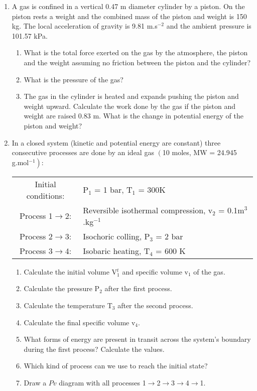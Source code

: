 \documentclass[12pts,a4paper,amsmath,amssymb,floatfix]{article}%
\begin{document}
\begin{enumerate}[label=\bfseries Problem \arabic*:]

\item\label{Tut02:CylinderPiston1}A gas is confined in a vertical 0.47 m diameter cylinder by a piston. On the piston rests a weight and the combined mass of the piston and weight is 150 kg. The local acceleration of gravity is 9.81 m.s$^{-2}$ and the ambient pressure is 101.57 kPa.
\begin{enumerate}
\item What is the total force exerted on the gas by the atmosphere, the piston and the weight assuming no friction between the piston and the cylinder?
\item What is the pressure of the gas? 
\item The gas in the cylinder is heated and expands pushing the piston and weight upward. Calculate the work done by the gas if the piston and weight are raised 0.83 m. What is the change in potential energy of the piston and weight?
\end{enumerate}

\item\label{Tut02:IdealGas1}In a closed system (kinetic and potential energy are constant) three consecutive processes are done by an ideal gas $\left(\right.$10 moles, MW = 24.945 g.mol$\left.^{-1}\right)$:
\begin{center}
\begin{tabular}{c l}
\hline
Initial conditions: & P$_{1}$ = 1 bar, T$_{1}$ = 300K \\
Process 1$\rightarrow$2: & Reversible isothermal compression, v$_{2}$ = 0.1m$^{3}$.kg$^{-1}$ \\
Process 2$\rightarrow$3: & Isochoric colling, P$_{3}$ = 2 bar \\
Process 3$\rightarrow$4: & Isobaric heating, T$_{4}$ = 600 K \\
\hline
\end{tabular}
\end{center}
\begin{enumerate}
\item Calculate the initial volume V$^{t}_{1}$ and specific volume v$_{1}$ of the gas.%
\item Calculate the pressure P$_{2}$ after the first process. %
\item Calculate the temperature T$_{3}$ after the second process.%
\item Calculate the final specific volume v$_{4}$. %
\item What forms of energy are present in transit across the system's boundary during the first process? Calculate the values. %
\item Which kind of process can we use to reach the initial state?
\item Draw a $Pv$ diagram with all processes 1$\rightarrow$2$\rightarrow$3$\rightarrow$4$\rightarrow$1.
\end{enumerate}



\end{enumerate}
\end{document}
